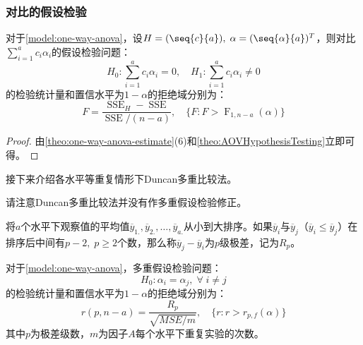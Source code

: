 \subsubsection{对比的假设检验}
\begin{theorem}
	对于\cref{model:one-way-anova}，设$H=(\seq{c}{a}),\;\alpha=(\seq{\alpha}{a})^T$，则对比$\sum\limits_{i=1}^{a}c_i\alpha_i$的假设检验问题：
	\begin{equation*}
		H_0:\sum_{i=1}^{a}c_i\alpha_i=0,\quad H_1:\sum_{i=1}^{a}c_i\alpha_i\ne0
	\end{equation*}
	的检验统计量和置信水平为$1-\alpha$的拒绝域分别为：
	\begin{equation*}
		F=\frac{\operatorname{SSE}_H-\operatorname{SSE}}{\operatorname{SSE}/(n-a)},\quad\{F:F>\operatorname{F}_{1,n-a}(\alpha)\}
	\end{equation*}
\end{theorem}
\begin{proof}
	由\cref{theo:one-way-anova-estimate}(6)和\cref{theo:AOVHypothesisTesting}立即可得。
\end{proof}
接下来介绍各水平等重复情形下Duncan多重比较法。
\begin{note}
	请注意Duncan多重比较法并没有作多重假设检验修正。
\end{note}
\begin{definition}
	将$a$个水平下观察值的平均值$\overline{y}_{1.},\overline{y}_{2.},\dots,\overline{y}_{a.}$从小到大排序。如果$\overline{y}_i$与$\overline{y}_j$（$\overline{y}_i\leqslant\overline{y}_j$）在排序后中间有$p-2,\;p\geqslant2$个数，那么称$\overline{y}_j-\overline{y}_i$为$p$级极差，记为$R_p$。
\end{definition}
\begin{theorem}
	对于\cref{model:one-way-anova}，多重假设检验问题：
	\begin{equation*}
	H_0:\alpha_i=\alpha_j,\;\forall\;i\ne j
	\end{equation*}
	的检验统计量和置信水平为$1-\alpha$的拒绝域分别为：
	\begin{equation*}
		r(p,n-a)=\frac{R_p}{\sqrt{MSE/m}},\quad\{r:r>r_{p,f}(\alpha)\}
	\end{equation*}
	其中$p$为极差级数，$m$为因子$A$每个水平下重复实验的次数。
\end{theorem}
